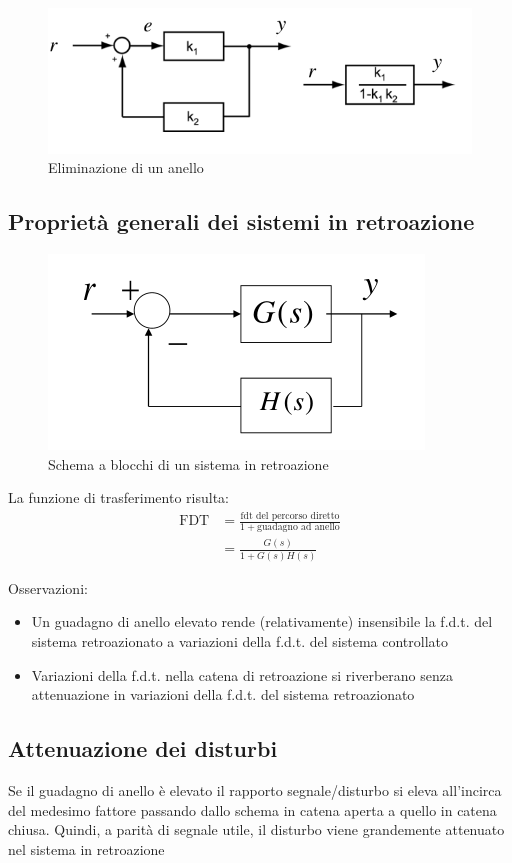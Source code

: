\begin{figure}[h!]
  \centering
  \includegraphics[width=0.3\linewidth]{images/eliminazione_anello.png}
  \caption{Eliminazione di un anello}
  \label{fig:eliminazione_anello}
\end{figure}



\newpage
\subsection{Proprietà generali dei sistemi in retroazione}
\begin{figure}[h!]
  \centering
  \includegraphics[width=0.3\linewidth]{images/retroazione.png}
  \caption{Schema a blocchi di un sistema in retroazione}
  \label{fig:retroazione}
\end{figure}


La funzione di trasferimento risulta:
\begin{align}
  \text{FDT} &= \frac{\text{fdt del percorso diretto}}{1 + \text{guadagno ad anello}} \\
  &= \frac{G(s)}{1 + G(s)H(s)}
\end{align}

Osservazioni:
\begin{itemize}
  \item Un guadagno di anello elevato rende (relativamente) 
        insensibile la f.d.t. del sistema retroazionato a variazioni della 
        f.d.t. del sistema controllato
  \item Variazioni della f.d.t. nella catena di retroazione si 
        riverberano senza attenuazione in variazioni della f.d.t. del sistema 
        retroazionato
\end{itemize}


\subsection{Attenuazione dei disturbi}
Se il guadagno di anello è elevato il rapporto segnale/disturbo si eleva
all’incirca del medesimo fattore passando dallo schema in catena aperta a
quello in catena chiusa. Quindi, a parità di segnale utile, il disturbo viene
grandemente attenuato nel sistema in retroazione


